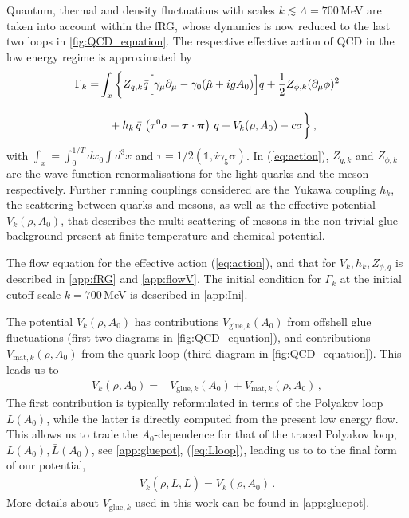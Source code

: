 \documentclass[%
reprint,
superscriptaddress,
showpacs,preprintnumbers,
amsmath,amssymb,
aps,
prd,
]{revtex4-1}
\def\eq#1{(\ref{#1})}
\begin{document}
Quantum, thermal and density fluctuations with scales $k\lesssim \Lambda= 700$\,MeV are taken into account within the fRG, whose dynamics is now reduced to the last two loops in \autoref{fig:QCD_equation}. The respective effective action of QCD in the low energy regime is approximated by 
%
\begin{align}
\Gamma_k=&\int_x \bigg\{Z_{q,k}\bar{q} \Big [\gamma_\mu \partial_\mu -\gamma_0(\hat\mu+igA_0) \Big ]q+\frac{1}{2}Z_{\phi,k}(\partial_\mu \phi)^2 \nonumber\\[2ex]
&\hspace{.3cm}+h_k\,\bar{q}\,
\left(\tau^0\sigma+\bm\tau
\cdot\bm{\pi}\right)\,q +V_k(\rho,A_0)-c\sigma \bigg\}\,,\label{eq:action}
\end{align}
%
with $\int_{x}=\int_0^{1/T}d x_0 \int d^3 x$ and $\tau=1/2 (\mathbb{1}, i \gamma_5 \bm \sigma)$. In \eq{eq:action}, $Z_{q,k}$ and $Z_{\phi,k}$ are the wave function renormalisations for the light quarks and the meson respectively. Further running couplings considered are the Yukawa coupling $h_k$, the scattering between quarks and mesons, as well as the effective potential $V_k(\rho,A_0)$, that describes the multi-scattering of mesons in the non-trivial glue background present at finite temperature and chemical potential.
	
The flow equation for the effective action \eq{eq:action}, and that for $V_k, h_k, Z_{\phi,q}$ is described in \autoref{app:fRG} and \autoref{app:flowV}. The initial condition for $\Gamma_k$ at the initial cutoff scale $k=700$\,MeV is described in \autoref{app:Ini}. 
	
The potential $V_k(\rho, A_0)$ has contributions $V_{\mathrm{glue},k}(A_0)$ from offshell glue fluctuations (first two diagrams in \autoref{fig:QCD_equation}), and contributions $V_{\mathrm{mat},k}(\rho,A_0)$ from the quark loop (third diagram in \autoref{fig:QCD_equation}). This leads us to 
%
\begin{align}
V_k(\rho,A_0)=&V_{\mathrm{glue},k}(A_0)+V_{\mathrm{mat},k}(\rho,A_0)\,,\label{eq:Vtotal}
\end{align}
%
The first contribution is typically reformulated in terms of the Polyakov loop $L(A_0)$, while the latter is directly computed from the present low energy flow. This allows us to trade the $A_0$-dependence for that of the traced Polyakov loop, $L(A_0), \bar L(A_0)$, see \autoref{app:gluepot}, \eq{eq:Lloop}, leading us to to the final form of our potential, 
%
\begin{align}
V_k(\rho, L,\bar L)= V_k(\rho, A_0)\,. 
\end{align}
More details about $V_{\mathrm{glue},k}$ used in this work can be found in \autoref{app:gluepot}. 
	
\end{document}
